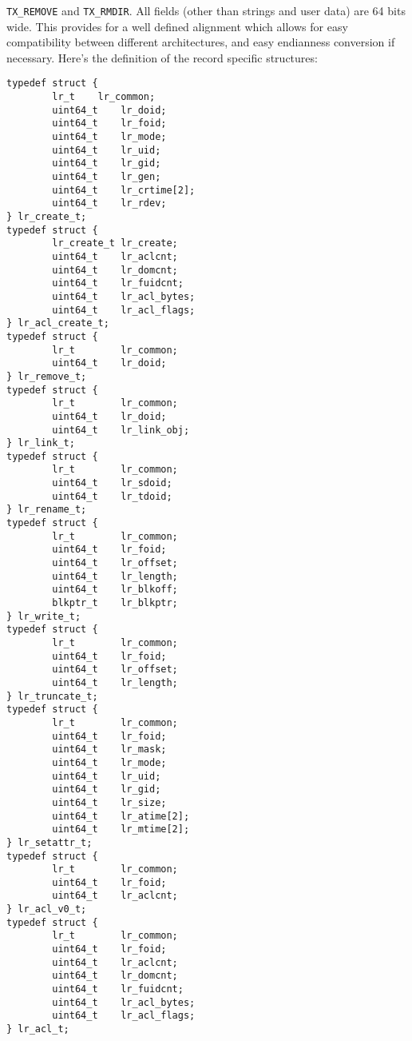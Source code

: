 \begin{description}
\begin{description}
    \lstinline{TX_REMOVE} and \lstinline{TX_RMDIR}.
    All fields (other than strings and user data) are 64 bits wide.
    This provides for a well defined alignment which allows for easy compatibility
    between different architectures,
    and easy endianness conversion if necessary.
    Here's the definition of the record specific structures:

\begin{lstlisting}[style=c]
typedef struct {
        lr_t	lr_common;
        uint64_t	lr_doid;
        uint64_t	lr_foid;
        uint64_t	lr_mode;
        uint64_t	lr_uid;
        uint64_t	lr_gid;
        uint64_t	lr_gen;
        uint64_t	lr_crtime[2];
        uint64_t	lr_rdev;
} lr_create_t;
typedef struct {
        lr_create_t	lr_create;
        uint64_t	lr_aclcnt;
        uint64_t	lr_domcnt;
        uint64_t	lr_fuidcnt;
        uint64_t	lr_acl_bytes;
        uint64_t	lr_acl_flags;
} lr_acl_create_t;
typedef struct {
        lr_t		lr_common;
        uint64_t	lr_doid;
} lr_remove_t;
typedef struct {
        lr_t		lr_common;
        uint64_t	lr_doid;
        uint64_t	lr_link_obj;
} lr_link_t;
typedef struct {
        lr_t		lr_common;
        uint64_t	lr_sdoid;
        uint64_t	lr_tdoid;
} lr_rename_t;
typedef struct {
        lr_t		lr_common;
        uint64_t	lr_foid;
        uint64_t	lr_offset;
        uint64_t	lr_length;
        uint64_t	lr_blkoff;
        blkptr_t	lr_blkptr;
} lr_write_t;
typedef struct {
        lr_t		lr_common;
        uint64_t	lr_foid;
        uint64_t	lr_offset;
        uint64_t	lr_length;
} lr_truncate_t;
typedef struct {
        lr_t		lr_common;
        uint64_t	lr_foid;
        uint64_t	lr_mask;
        uint64_t	lr_mode;
        uint64_t	lr_uid;
        uint64_t	lr_gid;
        uint64_t	lr_size;
        uint64_t	lr_atime[2];
        uint64_t	lr_mtime[2];
} lr_setattr_t;
typedef struct {
        lr_t		lr_common;
        uint64_t	lr_foid;
        uint64_t	lr_aclcnt;
} lr_acl_v0_t;
typedef struct {
        lr_t		lr_common;
        uint64_t	lr_foid;
        uint64_t	lr_aclcnt;
        uint64_t	lr_domcnt;
        uint64_t	lr_fuidcnt;
        uint64_t	lr_acl_bytes;
        uint64_t	lr_acl_flags;
} lr_acl_t;
\end{lstlisting}
  \end{description}
\end{description}
